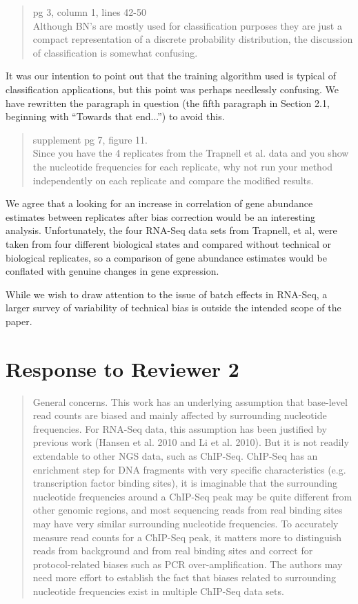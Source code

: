 \documentclass{article}
\begin{document}
\begin{quote}
pg 3, column 1, lines 42-50 \\
Although BN's are mostly used for classification purposes they are just a
compact representation of a discrete probability distribution, the discussion
of classification is somewhat confusing.
\end{quote}

It was our intention to point out that the training algorithm used is typical of
classification applications, but this point was perhaps needlessly confusing.
We have rewritten the paragraph in question (the fifth paragraph in Section 2.1,
beginning with ``Towards that end...'') to avoid this.


\begin{quote}
supplement pg 7, figure 11. \\
Since you have the 4 replicates from the Trapnell et al. data and you show the
nucleotide frequencies for each replicate, why not run your method independently
on each replicate and compare the modified results.
\end{quote}

We agree that a looking for an increase in correlation of gene abundance
estimates between replicates after bias correction would be an interesting
analysis. Unfortunately, the four RNA-Seq data sets from Trapnell, et al, were
taken from four different biological states and compared without technical or
biological replicates, so a comparison of gene abundance estimates would be
conflated with genuine changes in gene expression.

While we wish to draw attention to the issue of batch effects in RNA-Seq, a larger
survey of variability of technical bias is outside the intended scope of the
paper.




\section*{Response to Reviewer 2}

\begin{quote}
General concerns. This work has an underlying assumption that base-level read
counts are biased and mainly affected by surrounding nucleotide frequencies.
For RNA-Seq data, this assumption has been justified by previous work (Hansen et
al. 2010 and Li et al. 2010). But it is not readily extendable to other NGS
data, such as ChIP-Seq. ChIP-Seq has an enrichment step for DNA fragments with
very specific characteristics (e.g. transcription factor binding sites), it is
imaginable that the surrounding nucleotide frequencies around a ChIP-Seq peak
may be quite different from other genomic regions, and most sequencing reads
from real binding sites may have very similar surrounding nucleotide
frequencies. To accurately measure read counts for a ChIP-Seq peak, it matters
more to distinguish reads from background and from real binding sites and
correct for protocol-related biases such as PCR over-amplification. The authors
may need more effort to establish the fact that biases related to surrounding
nucleotide frequencies exist in multiple ChIP-Seq data sets.
\end{quote}
\end{document}
